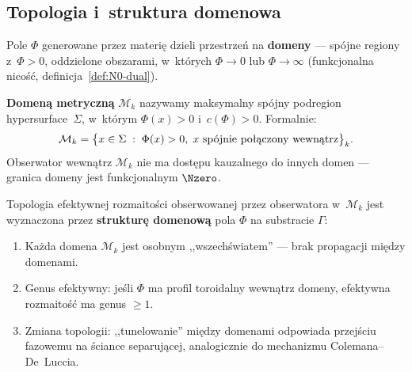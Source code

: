 \subsection{Topologia i~struktura domenowa}\label{ssec:topologia}

Pole $\Phi$ generowane przez materi\k{e} dzieli przestrze\'n na
\textbf{domeny} --- sp\'ojne regiony z~$\Phi > 0$, oddzielone
obszarami, w~kt\'orych $\Phi \to 0$ lub $\Phi \to \infty$
(funkcjonalna nico\'s\'c, definicja~\ref{def:N0-dual}).

\begin{definition}\label{def:domena}
\textbf{Domen\k{a} metryczn\k{a}} $\mathcal{M}_k$ nazywamy
maksymalny sp\'ojny podregion hypersurface~$\Sigma$, w~kt\'orym
$\Phi(x) > 0$ i~$c(\Phi) > 0$. Formalnie:
\begin{equation}\label{eq:domena}
    \mathcal{M}_k = \bigl\{x \in \Sigma \;:\;
    \Phi(x) > 0,\;
    x \text{ sp\'ojnie po\l{}\k{a}czony wewn\k{a}trz}\bigr\}_k.
\end{equation}
Obserwator wewn\k{a}trz $\mathcal{M}_k$ nie ma dost\k{e}pu
kauzalnego do innych domen --- granica domeny jest
funkcjonalnym $\Nzero$.
\end{definition}

\begin{hypothesis}\label{hyp:topologia}
Topologia efektywnej rozmaito\'sci obserwowanej przez
obserwatora w~$\mathcal{M}_k$ jest wyznaczona przez
\textbf{struktur\k{e} domenow\k{a}} pola $\Phi$ na substracie $\Gamma$:
\begin{enumerate}[nosep]
  \item Ka\.zda domena $\mathcal{M}_k$ jest osobnym
        ,,wszech\'swiatem'' --- brak propagacji mi\k{e}dzy domenami.
  \item Genus efektywny: je\'sli $\Phi$ ma profil toroidalny
        wewn\k{a}trz domeny, efektywna rozmaito\'s\'c ma
        genus $\geq 1$.
  \item Zmiana topologii: ,,tunelowanie'' mi\k{e}dzy domenami
        odpowiada przej\'sciu fazowemu na \'sciance separuj\k{a}cej,
        analogicznie do mechanizmu Colemana--De~Luccia.
\end{enumerate}
\end{hypothesis}

